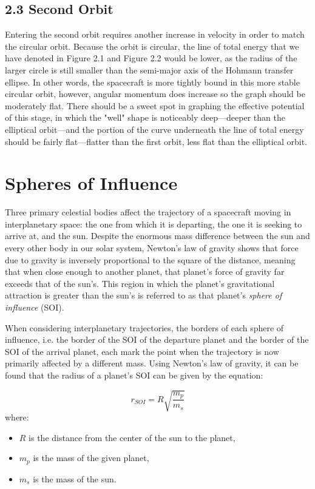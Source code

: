 \documentclass{article}
\numberwithin{figure}{section}
\begin{document}
\subsection{2.3 Second Orbit}
Entering the second orbit requires another increase in velocity in order to match the circular orbit. Because the orbit is circular, the line of total energy that we have denoted in Figure 2.1 and Figure 2.2 would be lower, as the radius of the larger circle is still smaller than the semi-major axis of the Hohmann transfer ellipse. In other words, the spacecraft is more tightly bound in this more stable circular orbit, however, angular momentum does increase so the graph should be moderately flat. There should be a sweet spot in graphing the effective potential of this stage, in which the "well" shape is noticeably deep---deeper than the elliptical orbit---and the portion of the curve underneath the line of total energy should be fairly flat---flatter than the first orbit, less flat than the elliptical orbit.

\section{Spheres of Influence}
Three primary celestial bodies affect the trajectory of a spacecraft moving in interplanetary space: the one from which it is departing, the one it is seeking to arrive at, and the sun. Despite the enormous mass difference between the sun and every other body in our solar system, Newton's law of gravity shows that force due to gravity is inversely proportional to the square of the distance, meaning that when close enough to another planet, that planet's force of gravity far exceeds that of the sun's. This region in which the planet's gravitational attraction is greater than the sun's is referred to as that planet's \textit{sphere of influence} (SOI). 

When considering interplanetary trajectories, the borders of each sphere of influence, i.e. the border of the SOI of the departure planet and the border of the SOI of the arrival planet, each mark the point when the trajectory is now primarily affected by a different mass. Using Newton's law of gravity, it can be found that the radius of a planet's SOI can be given by the equation:

\[
r_{SOI}=R\sqrt{\frac{m_{p}}{m_{s}}}
\]
where:
\begin{itemize}
    \item \(R\) is the distance from the center of the sun to the planet,
    \item \(m_{p}\) is the mass of the given planet,
    \item \(m_{s}\) is the mass of the sun.
\end{itemize}
\end{document}
